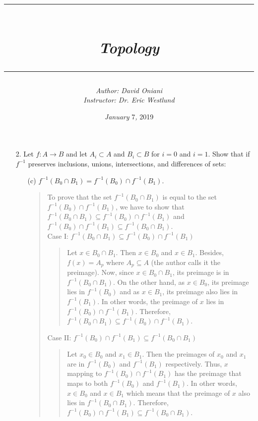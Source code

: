 \documentclass[12pt, a4paper]{article}
\title{\rule{\paperwidth - 150pt}{1pt}\textbf{\\\textit{Topology}\\}\rule{\paperwidth - 150pt}{1pt}}
\author
{
\textit{Author: David Oniani}
\\
\textit{Instructor: Dr. Eric Westlund}
}
\date{\textit{January }7\textit{, }2019}
\newcommand{\rarr}{\rightarrow}
\begin{document}
\maketitle


\begin{itemize}
\vspace{0.3cm}


\item[2.]
Let $f : A \rarr B$ and let $A_i \subset A$ and $B_i \subset B$
for $i = 0$ and $i = 1$. Show that if $f^{-1}$ preserves inclusions,
unions, intersections, and differences of sets:

\begin{itemize}
\item[(c)]
$f^{-1}(B_0 \cap B_1) = f^{-1}(B_0) \cap f^{-1}(B_1)$.
\vspace{0.25cm}

\begin{quote}
To prove that the set $f^{-1}(B_0 \cap B_1)$
is equal to the set $f^{-1}(B_0) \cap f^{-1}(B_1)$,
we have to show that $f^{-1}(B_0 \cap B_1) \subseteq f^{-1}(B_0) \cap f^{-1}(B_1)$
and $f^{-1}(B_0) \cap f^{-1}(B_1) \subseteq f^{-1}(B_0 \cap B_1)$.
\\
\vspace{0.5cm}
Case I: $f^{-1}(B_0 \cap B_1) \subseteq f^{-1}(B_0) \cap f^{-1}(B_1)$\\
\vspace{0.15cm}

\begin{quote}
Let $x \in B_0 \cap B_1$. Then $x \in B_0$ and $x \in B_1$. Besides,
$f(x) = A_p$ where $A_p \subseteq A$ (the author calls it the preimage).
Now, since $x \in B_0 \cap B_1$, its preimage is in $f^{-1}(B_0 \cap B_1)$.
On the other hand, as $x \in B_0$, its preimage lies in $f^{-1}(B_0)$ and as
$x \in B_1$, its preimage also lies in $f^{-1}(B_1)$. In other words, the preimage of $x$
lies in $f^{-1}(B_0) \cap f^{-1}(B_1)$. Therefore, $f^{-1}(B_0 \cap B_1) \subseteq f^{-1}(B_0) \cap f^{-1}(B_1)$.
\end{quote}

\vspace{0.5cm}
Case II: $f^{-1}(B_0) \cap f^{-1}(B_1) \subseteq f^{-1}(B_0 \cap B_1)$\\
\vspace{0.15cm}

\begin{quote}
Let $x_0 \in B_0$ and $x_1 \in B_1$. Then the preimages of $x_0$ and $x_1$ are in
$f^{-1}(B_0)$ and $f^{-1}(B_1)$ respectively. Thus, $x$ mapping to $f^{-1}(B_0) \cap f^{-1}(B_1)$
has the preimage that maps to both $f^{-1}(B_0)$ and $f^{-1}(B_1)$. In other words,
$x \in B_0$ and $x \in B_1$ which means that the preimage of $x$ also lies in $f^{-1}(B_0 \cap B_1)$.
Therefore, $f^{-1}(B_0) \cap f^{-1}(B_1) \subseteq f^{-1}(B_0 \cap B_1)$.
\end{quote}
\vspace{0.5cm}


\end{quote}
\end{itemize}
\end{itemize}
\end{document}
